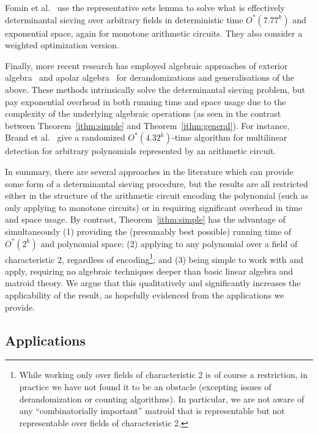 \documentclass{theoretics}
\begin{document}
Fomin et al.~\cite[Section~5.1]{FominLPS17} use the representative
sets lemma to solve what is effectively determinantal sieving over
arbitrary fields in deterministic time $O^*(7.77^k)$ and exponential
space, again for monotone arithmetic circuits.
They also consider a weighted optimization version.

Finally, more recent research has employed algebraic approaches of
exterior algebra~\cite{BrandDH18} and apolar algebra~\cite{BrandP21}
for derandomizations and generalisations of the above. 
These methods intrinsically solve the determinantal sieving problem,
but pay exponential overhead in both running time and space usage due
to the complexity of the underlying algebraic operations
(as seen in the contrast between Theorem~\ref{ithm:simple}
and Theorem~\ref{ithm:general}). 
For instance, Brand et al.~\cite{BrandDH18} give a randomized $O^*(4.32^k)$-time algorithm for multilinear 
detection for arbitrary polynomials represented by an arithmetic circuit.

In summary, there are several approaches in the literature which can 
provide some form of a determinantal sieving procedure, but
the results are all restricted either in the structure
of the arithmetic circuit encoding the polynomial (such as only
applying to monotone circuits) or in requiring significant 
overhead in time and space usage. By contrast, Theorem~\ref{ithm:simple}
has the advantage of simultaneously (1) providing the (presumably best
possible) running time of $O^*(2^k)$ and polynomial space;
(2) applying to any polynomial over a field of characteristic 2,
regardless of encoding\footnote{While working only over fields of
  characteristic 2 is of course a restriction, in practice we have not
  found it to be an obstacle (excepting issues of derandomization
  or counting algorithms). In particular, we are not
  aware of any ``combinatorially important'' matroid that is
  representable but not representable over fields of characteristic 2.
};
and (3) being simple to work with and apply,
requiring no algebraic techniques deeper than basic linear algebra and
matroid theory. We argue that this qualitatively and significantly
increases the applicability of the result, as hopefully evidenced from
the applications we provide.

\subsection{Applications}
\end{document}
